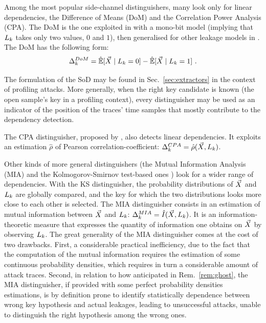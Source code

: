 Among the most popular side-channel distinguishers, many look only for linear dependencies, \eg the Difference of Means (DoM) and the Correlation Power Analysis (CPA). The DoM is the one exploited in \cite{kocher1999differential} with a mono-bit model (implying that $L_k$ takes only two values, $0$ and $1$), then generalised for other leakage models in \cite{bevan2002ways,messerges2002examining}. The DoM has the following form: 
\begin{equation}
\distinguisher^{DoM}_{\keyVar} = \esperEst[\given{\vaLeakVec}{\leakageModel_\keyVar = 0}] - \esperEst[\given{\vaLeakVec}{\leakageModel_\keyVar = 1}]   \mbox{ .}
\end{equation}
\begin{remark}
The formulation of the SoD may be found in Sec.~\ref{sec:extractors} in the context of profiling attacks. More generally, when the right key candidate is known (\eg the open sample's key in a profiling context), every distinguisher may be used as an indicator of the position of the traces' time samples that mostly contribute to the dependency detection.
\end{remark}

The CPA distinguisher, proposed by \cite{brier2004correlation}, also detects linear dependencies. It exploits an estimation $\hat{\rho}$ of Pearson correlation-coefficient: $\Delta^{CPA}_{k} = \hat{\rho}(\vec{X}, L_k )$.


Other kinds of more general distinguishers (\eg the Mutual Information Analysis (MIA) \cite{gierlichs2008mutual,batina2011mutual} and the Kolmogorov-Smirnov test-based ones \cite{veyrat2009mutual}) look for a wider range of dependencies. With the KS distinguisher, the probability distributions of $\vec{X}$ and $L_k$ are globally compared, and the key for which the two distributions looks more close to each other is selected. The MIA distinguisher consists in an estimation of mutual information between $\vec{X}$ and $L_k$: $\Delta^{MIA}_{k} = \hat{I}(\vec{X}, L_k )$. It is an information-theoretic measure that expresses the quantity of information one obtains on $\vec{X}$ by observing $L_k$. The great generality of the MIA distinguisher comes at the cost of two drawbacks. First, a considerable practical inefficiency, due to the fact that the computation of the mutual information requires the estimation of some continuous probability densities, which requires in turn a considerable amount of attack traces. Second, in relation to how anticipated in Rem.~\ref{rem:ghost}, the MIA distinguisher, if provided with some perfect probability densities estimations, is by definition prone to identify statistically dependence between wrong key hypothesis and actual leakages, leading to unsuccessful attacks, unable to distinguish the right hypothesis among the wrong ones.  \\

